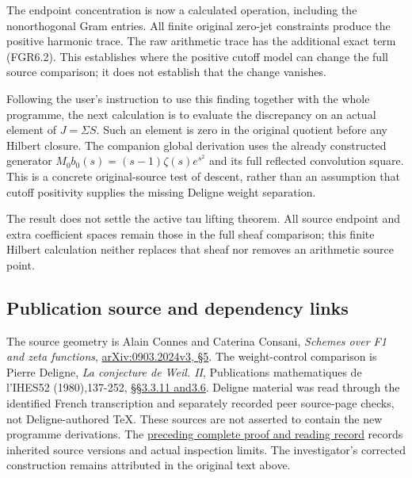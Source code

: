 The endpoint concentration is now a calculated operation, including the
nonorthogonal Gram entries. All finite original zero-jet constraints
produce the positive harmonic trace. The raw arithmetic trace has the
additional exact term (FGR6.2). This establishes where the positive
cutoff model can change the full source comparison; it does not
establish that the change vanishes.

Following the user's instruction to use this finding together with the
whole programme, the next calculation is to evaluate the discrepancy on
an actual element of \(J=\Sigma S\). Such an element is zero in the
original quotient before any Hilbert closure. The companion global
derivation uses the already constructed generator
\(M_0b_0(s)=(s-1)\zeta(s)e^{s^2}\) and its full reflected convolution
square. This is a concrete original-source test of descent, rather than
an assumption that cutoff positivity supplies the missing Deligne weight
separation.

The result does not settle the active tau lifting theorem. All source
endpoint and extra coefficient spaces remain those in the full sheaf
comparison; this finite Hilbert calculation neither replaces that sheaf
nor removes an arithmetic source point.

\subsection{Publication source and dependency
links}\label{publication-source-and-dependency-links}

The source geometry is Alain Connes and Caterina Consani, \emph{Schemes
over F1 and zeta functions},
\href{https://arxiv.org/abs/0903.2024v3}{arXiv:0903.2024v3, §5}. The
weight-control comparison is Pierre Deligne, \emph{La conjecture de
Weil. II}, Publications mathematiques de l'IHES52 (1980),137-252,
\href{https://www.numdam.org/item/PMIHES_1980__52__137_0/}{§§3.3.11
and3.6}. Deligne material was read through the identified French
transcription and separately recorded peer source-page checks, not
Deligne-authored TeX. These sources are not asserted to contain the new
programme derivations. The
\href{https://github.com/KokunoYumeto/zeta-function-research-reader/blob/36a82ecca98addb8a98b48204e349737856c7223/workbenches/splitzero-tandem/continuations/20260924-cohomology-weight-and-character-lifts/BUILD_AND_REVIEW.md}{preceding
complete proof and reading record} records inherited source versions and
actual inspection limits. The investigator's corrected construction
remains attributed in the original text above.
